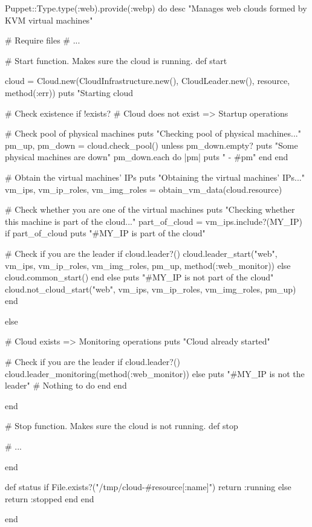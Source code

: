 \begin{rubycode}
Puppet::Type.type(:web).provide(:webp) do
   desc "Manages web clouds formed by KVM virtual machines"

   # Require files
   # ...

   # Start function. Makes sure the cloud is running.
   def start
   
      cloud = Cloud.new(CloudInfrastructure.new(), CloudLeader.new(), resource,
                        method(:err))
      puts "Starting cloud %
      
      # Check existence
      if !exists?
         # Cloud does not exist => Startup operations
         
         # Check pool of physical machines
         puts "Checking pool of physical machines..."
         pm_up, pm_down = cloud.check_pool()
         unless pm_down.empty?
            puts "Some physical machines are down"
            pm_down.each do |pm|
               puts " - #{pm}"
            end
         end
         
         # Obtain the virtual machines' IPs
         puts "Obtaining the virtual machines' IPs..."
         vm_ips, vm_ip_roles, vm_img_roles = obtain_vm_data(cloud.resource)
         
         # Check whether you are one of the virtual machines
         puts "Checking whether this machine is part of the cloud..."
         part_of_cloud = vm_ips.include?(MY_IP)
         if part_of_cloud
            puts "#{MY_IP} is part of the cloud"
            
            # Check if you are the leader
            if cloud.leader?()
               cloud.leader_start("web", vm_ips, vm_ip_roles, vm_img_roles,
                                  pm_up, method(:web_monitor))
            else
               cloud.common_start()
            end
         else
            puts "#{MY_IP} is not part of the cloud"
            cloud.not_cloud_start("web", vm_ips, vm_ip_roles, vm_img_roles,
                                  pm_up)
         end
         
      else
         
         # Cloud exists => Monitoring operations
         puts "Cloud already started"
         
         # Check if you are the leader
         if cloud.leader?()
            cloud.leader_monitoring(method(:web_monitor))
         else
            puts "#{MY_IP} is not the leader"      # Nothing to do
         end
      end
      
   end


   # Stop function. Makes sure the cloud is not running.
   def stop

      # ...
   
   end


   def status
      if File.exists?("/tmp/cloud-#{resource[:name]}")
         return :running
      else
         return :stopped
      end
   end
   
end
\end{rubycode}

